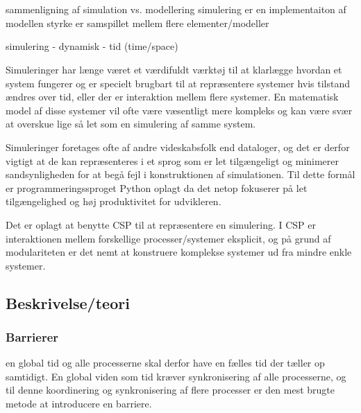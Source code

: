 \chapter{\Des}
sammenligning af simulation vs. modellering
  simulering er en implementaiton af modellen
  styrke er samspillet mellem flere elementer/modeller


simulering - dynamisk - tid (time/space)

Simuleringer har længe været et værdifuldt værktøj til at klarlægge hvordan et 
system fungerer og er specielt brugbart til at repræsentere systemer hvis 
tilstand ændres over tid, eller der er interaktion mellem flere systemer. En 
matematisk model af disse systemer vil ofte være væsentligt mere kompleks og 
kan være svær at overskue lige så let som en simulering af samme system. 

Simuleringer foretages ofte af andre videskabsfolk end dataloger, og det er 
derfor vigtigt at de kan repræsenteres i et sprog som er let tilgængeligt og 
minimerer sandsynligheden for at begå fejl i konstruktionen af simulationen.  
Til dette formål er programmeringssproget Python oplagt da det netop fokuserer 
på let tilgængelighed og høj produktivitet for udvikleren. 

Det er oplagt at benytte CSP\cite{hoare-csp} til at repræsentere en simulering.  
I CSP er interaktionen mellem forskellige processer/systemer eksplicit, og på 
grund af modulariteten er det nemt at konstruere komplekse systemer ud fra 
mindre enkle systemer. 

\section{Beskrivelse/teori} \label{sec:des-teori}

\subsection{Barrierer} \label{sec:barrierer}
   en 
global tid og alle processerne skal derfor have en fælles tid der tæller op 
samtidigt.  En global viden som tid kræver synkronisering af alle 
processerne, og til denne koordinering og synkronisering af flere 
processer er den mest brugte metode at introducere en barriere.

